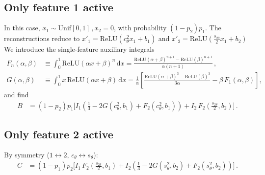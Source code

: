 \documentclass[a4paper]{article}
\begin{document}
\subsection{Only feature 1 active} In this case, $x_1\sim\mathrm{Unif}[0,1]\,, x_2=0$, with probability $(1-p_2)p_1$. The reconstructions reduce to $x'_1=\mathrm{ReLU}\left(c_\theta^2 x_1+b_1\right)$ and $x'_2=\mathrm{ReLU}(\frac{s_{2\theta}}{2} x_1+b_2)$
We introduce the single-feature auxiliary integrals
\begin{align}
F_n(\alpha,\beta) &\equiv \int_0^1 \mathrm{ReLU}(\alpha x+\beta)^n\,\mathrm{d}x
= \frac{\mathrm{ReLU}(\alpha+\beta)^{n+1}-\mathrm{ReLU}(\beta)^{n+1}}{\alpha(n+1)}\,, \\[6pt]
G(\alpha,\beta) &\equiv \int_0^1 x\,\mathrm{ReLU}(\alpha x+\beta)\,\mathrm{d}x
= \frac{1}{\alpha}\!\left[\frac{\mathrm{ReLU}(\alpha+\beta)^3-\mathrm{ReLU}(\beta)^3}{3\alpha} - \beta\,F_1(\alpha,\beta)\right],
\end{align}
and find
\begin{align}
B &= (1-p_2)p_1\bigg[I_1\!\left(\tfrac{1}{3}-2G(c^2_\theta,b_1)+F_2(c^2_\theta,b_1)\right)
+ I_2\,F_2\!\left(\tfrac{s_{2\theta}}{2},b_2\right)\bigg]\,.
\end{align}
\subsection{Only feature 2 active} 
By symmetry ($1\leftrightarrow 2$, $c_\theta\leftrightarrow s_\theta$):
\begin{align}
C &= (1-p_1)p_2\bigg[I_1\,F_2\!\left(\tfrac{s_{2\theta}}{2},b_1\right)
+ I_2\!\left(\tfrac{1}{3} - 2G(s^2_\theta,b_2) + F_2(s^2_\theta,b_2)\right)\bigg]\,.
\end{align}
\end{document}
